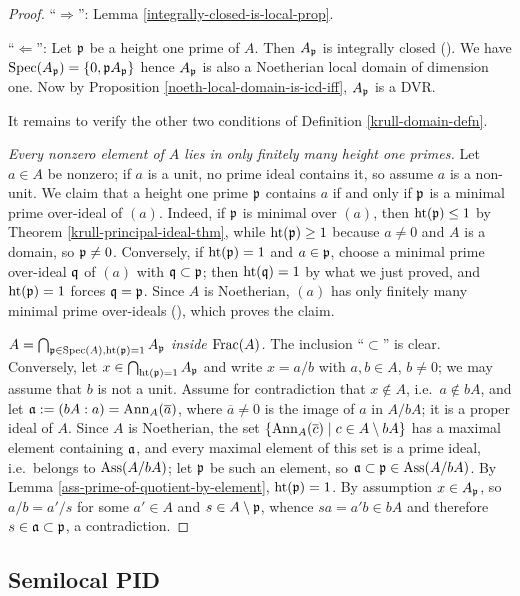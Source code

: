 \begin{proof}
\leanok
``$\Rightarrow$'': Lemma \ref{integrally-closed-is-local-prop}.

``$\Leftarrow$'': Let ${\mathfrak{p}}$ be a height one prime of $A$.
Then $A_{\mathfrak{p}}$ is integrally closed ().
We have ${\mathrm{Spec}}(A_{\mathfrak{p}})=\{0,{\mathfrak{p}} A_{\mathfrak{p}}\}$ hence
$A_{\mathfrak{p}}$ is also a Noetherian local domain of dimension one.
Now by Proposition \ref{noeth-local-domain-is-icd-iff}, $A_{\mathfrak{p}}$ is a DVR.

It remains to verify the other two conditions of Definition \ref{krull-domain-defn}.

\emph{Every nonzero element of $A$ lies in only finitely many height one primes.}
Let $a\in A$ be nonzero; if $a$ is a unit, no prime ideal contains it, so assume
$a$ is a non-unit. We claim that a height one prime ${\mathfrak{p}}$ contains $a$ if and only
if ${\mathfrak{p}}$ is a minimal prime over-ideal of $(a)$.
Indeed, if ${\mathfrak{p}}$ is minimal over $(a)$, then ${\mathrm{ht}}({\mathfrak{p}})\leq 1$ by
Theorem \ref{krull-principal-ideal-thm}, while ${\mathrm{ht}}({\mathfrak{p}})\geq 1$ because
$a\neq 0$ and $A$ is a domain, so ${\mathfrak{p}}\neq 0$.
Conversely, if ${\mathrm{ht}}({\mathfrak{p}})=1$ and $a\in{\mathfrak{p}}$, choose a minimal prime over-ideal
${\mathfrak{q}}$ of $(a)$ with ${\mathfrak{q}}\subset{\mathfrak{p}}$; then ${\mathrm{ht}}({\mathfrak{q}})=1$ by what we just proved,
and ${\mathrm{ht}}({\mathfrak{p}})=1$ forces ${\mathfrak{q}}={\mathfrak{p}}$.
Since $A$ is Noetherian, $(a)$ has only finitely many minimal prime over-ideals
(), which proves the claim.

\emph{$A=\bigcap_{{\mathfrak{p}}\in{\mathrm{Spec}}(A),{\mathrm{ht}}({\mathfrak{p}})=1}A_{\mathfrak{p}}$ inside ${\mathrm{Frac}}(A)$.}
The inclusion ``$\subset$'' is clear. Conversely, let
$x\in\bigcap_{{\mathrm{ht}}({\mathfrak{p}})=1}A_{\mathfrak{p}}$ and write $x=a/b$ with $a,b\in A$, $b\neq 0$;
we may assume that $b$ is not a unit.
Assume for contradiction that $x\notin A$, i.e.~$a\notin bA$, and let
${\mathfrak{a}}:=(bA:a)={\mathrm{Ann}}_A(\overline a)$, where $\overline a\neq 0$ is the image of $a$
in $A/bA$; it is a proper ideal of $A$.
Since $A$ is Noetherian, the set $\{{\mathrm{Ann}}_A(\overline c)\mid c\in A\setminus bA\}$
has a maximal element containing ${\mathfrak{a}}$, and every maximal element of this set is
a prime ideal, i.e.~belongs to $\operatorname{Ass}(A/bA)$;
let ${\mathfrak{p}}$ be such an element, so ${\mathfrak{a}}\subset{\mathfrak{p}}\in\operatorname{Ass}(A/bA)$.
By Lemma \ref{ass-prime-of-quotient-by-element}, ${\mathrm{ht}}({\mathfrak{p}})=1$.
By assumption $x\in A_{\mathfrak{p}}$, so $a/b=a'/s$ for some $a'\in A$ and
$s\in A\setminus{\mathfrak{p}}$, whence $sa=a'b\in bA$ and therefore
$s\in{\mathfrak{a}}\subset{\mathfrak{p}}$, a contradiction.
\end{proof}

\subsection{Semilocal PID}

